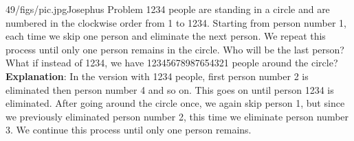 \begin{problem}{49/figs/pic.jpg}{Josephus Problem}  1234 people are standing in a circle and are numbered in the clockwise order from 1 to 1234. Starting from person number 1, each time we skip one person and eliminate the next person. We repeat this process until only one person remains in the circle. Who will be the last person?\\[0.2cm]
	
What if instead of 1234, we have 12345678987654321 people around the circle?\\[0.2cm]
	
\textbf{Explanation}: In the version with 1234 people, first person number 2 is eliminated then person number 4 and so on. This goes on until person 1234 is eliminated. After going around the circle once, we again skip person 1, but since we previously eliminated person number 2, this time we eliminate person number 3. We continue this process until only one person remains.
\end{problem}